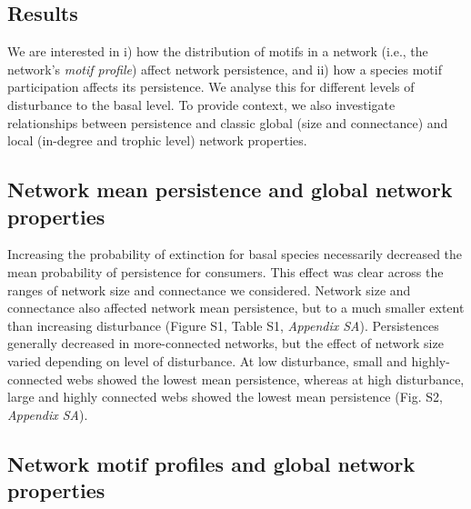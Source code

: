 \documentclass[12pt]{article}
\begin{document}
\begin{spacing}{2.0}
            

\section*{Results}

    We are interested in i) how the distribution of motifs in a network (i.e., the network's \emph{motif profile}) affect network persistence, and ii) how a species motif participation affects its persistence. We analyse this for different levels of disturbance to the basal level. To provide context, we also investigate relationships between persistence and classic global (size and connectance) and local (in-degree and trophic level) network properties.
    
    \subsection*{Network mean persistence and global network properties}
    
        Increasing the probability of extinction for basal species necessarily decreased the mean probability of persistence for consumers. 
        This effect was clear across the ranges of network size and connectance we considered. 
        Network size and connectance also affected network mean persistence, but to a much smaller extent than increasing disturbance (Figure S1, Table S1, \emph{Appendix SA}). 
        Persistences generally decreased in more-connected networks, but the effect of network size varied depending on level of disturbance. 
        At low disturbance, small and highly-connected webs showed the lowest mean persistence, whereas at high disturbance, large and highly connected webs showed the lowest mean persistence (Fig. S2, \emph{Appendix SA}).

    \subsection*{Network motif profiles and global network properties}


\end{spacing}
\end{document}

